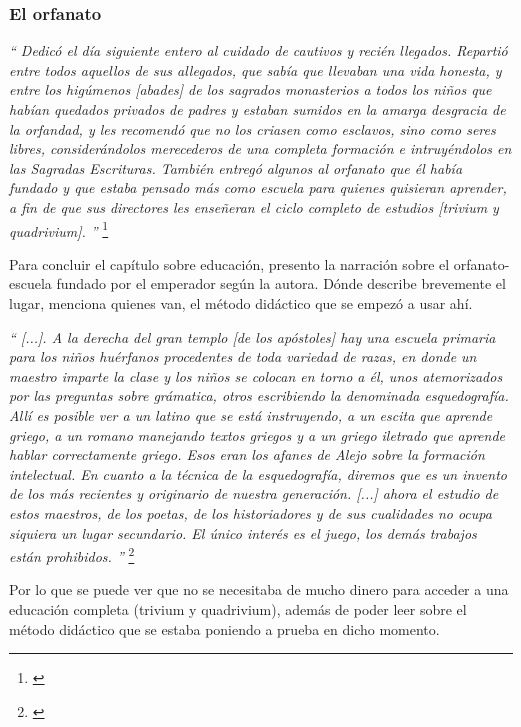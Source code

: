 

\subsubsection{El orfanato}

\textit{``
	Dedicó el día siguiente entero al cuidado de
	cautivos y recién llegados. Repartió entre todos
	aquellos de sus allegados, que sabía que llevaban una
	vida honesta, y entre los higúmenos [abades] de los sagrados
	monasterios a todos los niños que habían quedados
	privados de padres y estaban sumidos en la amarga desgracia
	de la orfandad, y les recomendó que no los criasen como
	esclavos, sino como seres libres, considerándolos merecederos
	de una completa formación e intruyéndolos en las
	Sagradas Escrituras. También entregó algunos al orfanato que
	él había fundado y que estaba pensado más como escuela para
	quienes quisieran aprender, a fin de que sus directores
	les enseñeran el ciclo completo de estudios [trivium y quadrivium].
	''}
\footnote{\cite[pp.~605--606]{alexiadaXV}}

Para concluir el capítulo sobre educación, presento la narración sobre
el orfanato-escuela fundado por el emperador según la autora.
Dónde describe brevemente el lugar, menciona quienes van, el método
didáctico que se empezó a usar ahí.

\textit{``
	[...]. A la derecha del gran templo [de los apóstoles] hay una escuela
	primaria para los niños huérfanos procedentes de toda variedad de razas,
	en donde un maestro imparte la clase y los niños se colocan en torno
	a él, unos atemorizados por las preguntas sobre grámatica, otros
	escribiendo la denominada esquedografía. Allí es posible ver a un
	latino que se está instruyendo, a un escita que aprende griego, a un
	romano manejando textos griegos y a un griego iletrado que aprende hablar
	correctamente griego. Esos eran los afanes de Alejo sobre la formación
	intelectual. En cuanto a la técnica de la esquedografía, diremos que es
	un invento de los más recientes y originario de nuestra generación. [...]
	ahora el estudio de estos maestros, de los poetas, de los historiadores
	y de sus cualidades no ocupa siquiera un lugar secundario. El único interés
	es el juego, los demás trabajos están prohibidos.
	''}
\footnote{\cite[p.~609]{alexiadaXV}}

Por lo que se puede ver que no se necesitaba de mucho dinero para acceder
a una educación completa (trivium y quadrivium), además de poder leer
sobre el método didáctico que se estaba poniendo a prueba en dicho momento.





















